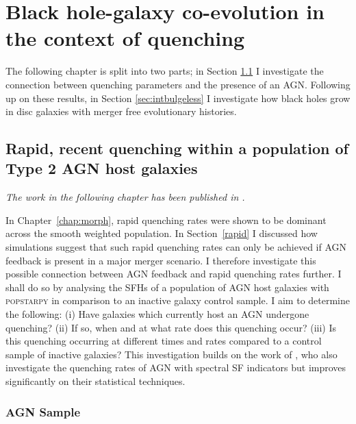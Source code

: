 
\chapter{Black hole-galaxy co-evolution in the context of quenching}\label{chap:agn}

The following chapter is split into two parts; in Section \ref{sec:agnfeedback} I investigate the connection between quenching parameters and the presence of an AGN. Following up on these results, in Section \ref{sec:intbulgeless} I investigate how black holes grow in disc galaxies with merger free evolutionary histories. 

\section{Rapid, recent quenching within a population of Type 2 AGN host galaxies}\label{sec:agnfeedback}

\emph{The work in the following chapter has been published in \citet{smethurst16}.}

In Chapter~\ref{chap:morph}, rapid quenching rates were shown to be dominant across the smooth weighted population. In Section~\ref{rapid} I discussed how simulations suggest that such rapid quenching rates can only be achieved if AGN feedback is present in a major merger scenario. I therefore investigate this possible connection between AGN feedback and rapid quenching rates further. I shall do so by analysing the SFHs of a population of AGN host galaxies with \textsc{popstarpy} in comparison to an inactive galaxy control sample. I  aim to determine the following: (i) Have galaxies which currently host an AGN undergone quenching? (ii) If so, when and at what rate does this quenching occur? (iii) Is this quenching occurring at different times and rates compared to a control sample of inactive galaxies? This investigation builds on the work of \citet{Martin07}, who also investigate the quenching rates of AGN with spectral SF indicators but improves significantly on their statistical techniques.

\subsection{AGN Sample}\label{agnsample}

